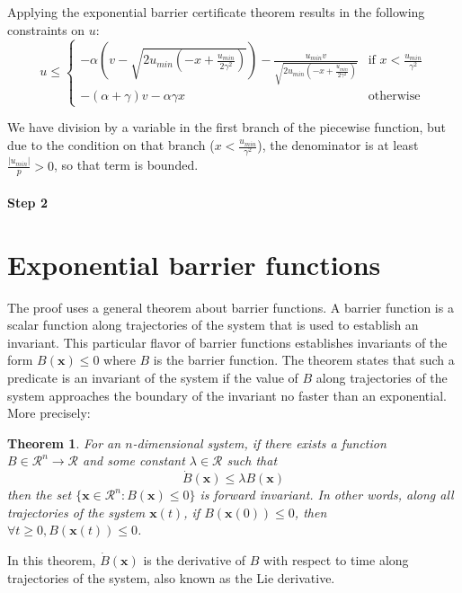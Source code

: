 \documentclass[12pt]{article}
\newtheorem{theorem}{Theorem}
\newcommand{\vecbold}[1]{\boldsymbol{#1}}
\newcommand{\umin}{u_{min}}
\newcommand{\p}{\gamma}
\newcommand{\q}{\alpha}
\begin{document}
Applying the exponential barrier certificate theorem results in the following constraints on $u$:
\[
u \leq
\begin{cases}
-\q(v - \sqrt{2\umin(-x + \frac{\umin}{2\p^2})}) - \frac{\umin v}{\sqrt{2\umin(-x + \frac{\umin}{2\p^2})}} & \text{if } x < \frac{\umin}{\p^2}\\
-(\q + \p) v -\q\p x & \text{otherwise}
\end{cases}
\]

We have division by a variable in the first branch of the piecewise function, but due to
the condition on that branch ($x < \frac{\umin}{\p^2}$), the denominator is
at least $\frac{|\umin|}{p} > 0$, so that term is bounded.

\paragraph*{Step 2}


\section{Exponential barrier functions}
The proof uses a general theorem about barrier functions. A barrier
function is a scalar function along trajectories of the system that is used
to establish an invariant. This particular flavor of barrier functions
establishes invariants of the form $B(\vecbold{x}) \leq 0$ where $B$ is the
barrier function. The theorem states that such a predicate is an invariant
of the system if the value of $B$ along trajectories of the system
approaches the boundary of the invariant no faster than an
exponential. More precisely:

\begin{theorem}
For an $n$-dimensional system, if there exists a function $B \in \mathcal{R}^n \rightarrow \mathcal{R}$ and some constant $\lambda \in \mathcal{R}$ such that
\[\dot{B}(\vecbold{x}) \leq \lambda B(\vecbold{x})\]
then the set $\{\vecbold{x} \in \mathcal{R}^n : B(\vecbold{x}) \leq 0\}$ is forward invariant. In other words, along all trajectories of the system $\vecbold{x}(t)$, if $B(\vecbold{x}(0)) \leq 0$, then $\forall t \geq 0, B(\vecbold{x}(t)) \leq 0$.
\label{thm:exp-barrier}
\end{theorem}

In this theorem, $\dot{B}(\vecbold{x})$ is the derivative of $B$ with
respect to time along trajectories of the system, also known as the Lie
derivative.
\end{document}
